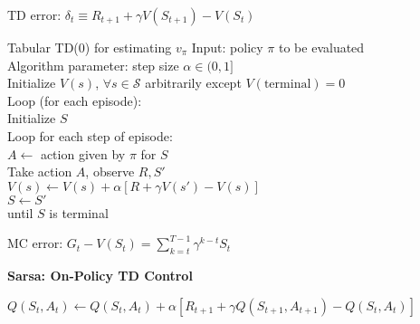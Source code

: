\documentclass[twocolumn]{article}
\begin{document}
TD error: $\delta_t \equiv R_{t+1} + \gamma V(S_{t+1}) - V(S_t)$

\begin{mydef}{Tabular TD(0) for estimating $v_\pi$}{}
    Input: policy $\pi$ to be evaluated \\
    Algorithm parameter: step size $\alpha \in (0, 1]$ \\
    Initialize $V(s)$, $\forall s \in \mathcal S$ arbitrarily except $V(\text{terminal}) = 0$ \\
    
        Loop (for each episode): \\
            \hspace*{2em}Initialize $S$ \\
            \hspace*{2em}Loop for each step of episode: \\
                \hspace*{4em}$A \leftarrow$ action given by $\pi$ for $S$ \\
                \hspace*{4em}Take action $A$, observe $R, S'$ \\
                \hspace*{4em}$V(s) \leftarrow V(s) + \alpha [R + \gamma V(s') - V(s)]$ \\
                \hspace*{4em}$S \leftarrow S'$ \\
            \hspace*{2em}until $S$ is terminal
\end{mydef}


\cleardoublepage

MC error: $G_t - V(S_t) = \sum_{k=t}^{T-1} \gamma^{k-t} S_t$

\dotfill

\textbf{Sarsa: On-Policy TD Control}

$Q(S_t, A_t) \leftarrow Q(S_t, A_t) + \alpha [R_{t+1} + \gamma Q(S_{t+1}, A_{t+1}) - Q(S_t, A_t)]$
\end{document}
